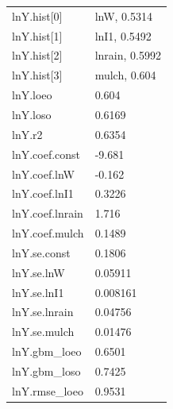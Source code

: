 {\begin{longtable}{p{}p{}}
{}lnY.hist[0] & lnW, 0.5314\\
{}lnY.hist[1] & lnI1, 0.5492\\
{}lnY.hist[2] & lnrain, 0.5992\\
{}lnY.hist[3] & mulch, 0.604\\
{}lnY.loeo & 0.604\\
{}lnY.loso & 0.6169\\
{}lnY.r2 & 0.6354\\
{}lnY.coef.const & -9.681\\
{}lnY.coef.lnW & -0.162\\
{}lnY.coef.lnI1 & 0.3226\\
{}lnY.coef.lnrain & 1.716\\
{}lnY.coef.mulch & 0.1489\\
{}lnY.se.const & 0.1806\\
{}lnY.se.lnW & 0.05911\\
{}lnY.se.lnI1 & 0.008161\\
{}lnY.se.lnrain & 0.04756\\
{}lnY.se.mulch & 0.01476\\
{}lnY.gbm\_loeo & 0.6501\\
{}lnY.gbm\_loso & 0.7425\\
{}lnY.rmse\_loeo & 0.9531\\
\bottomrule\end{longtable}}

